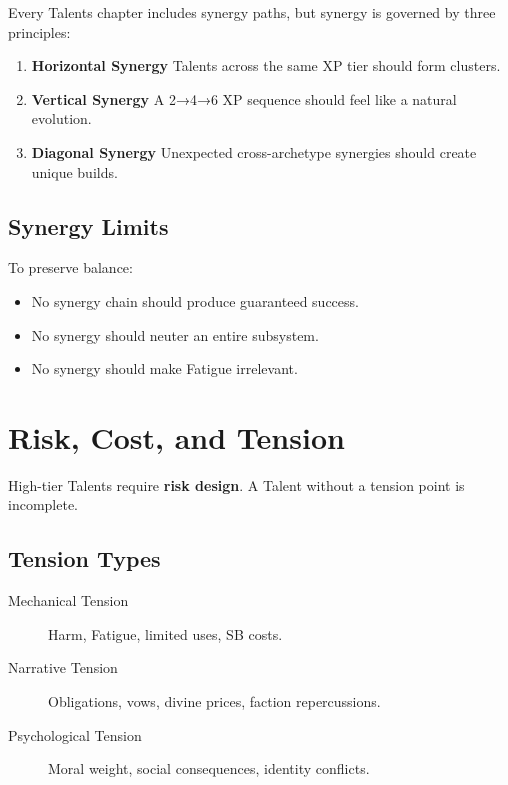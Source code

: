 \documentclass[11pt]{book}
\begin{document}
Every Talents chapter includes synergy paths,
but synergy is governed by three principles:

\begin{enumerate}
    \item \textbf{Horizontal Synergy}  
    Talents across the same XP tier should form clusters.

    \item \textbf{Vertical Synergy}  
    A 2→4→6 XP sequence should feel like a natural evolution.

    \item \textbf{Diagonal Synergy}  
    Unexpected cross-archetype synergies should create unique builds.
\end{enumerate}

\subsection{Synergy Limits}

To preserve balance:
\begin{itemize}
    \item No synergy chain should produce guaranteed success.  
    \item No synergy should neuter an entire subsystem.  
    \item No synergy should make Fatigue irrelevant.  
\end{itemize}

\section{Risk, Cost, and Tension}

High-tier Talents require \textbf{risk design}.
A Talent without a tension point is incomplete.

\subsection{Tension Types}

\begin{description}
    \item[Mechanical Tension]  
    Harm, Fatigue, limited uses, SB costs.

    \item[Narrative Tension]  
    Obligations, vows, divine prices, faction repercussions.

    \item[Psychological Tension]  
    Moral weight, social consequences, identity conflicts.
\end{description}
\end{document}
